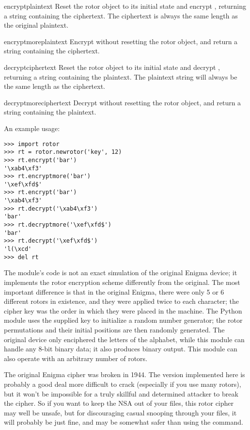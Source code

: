 \begin{methoddesc}[rotor]{encrypt}{plaintext}
Reset the rotor object to its initial state and encrypt ,
returning a string containing the ciphertext.  The ciphertext is always the
same length as the original plaintext.
\end{methoddesc}

\begin{methoddesc}[rotor]{encryptmore}{plaintext}
Encrypt  without resetting the rotor object, and return a
string containing the ciphertext.
\end{methoddesc}

\begin{methoddesc}[rotor]{decrypt}{ciphertext}
Reset the rotor object to its initial state and decrypt ,
returning a string containing the plaintext.  The plaintext string will
always be the same length as the ciphertext.
\end{methoddesc}

\begin{methoddesc}[rotor]{decryptmore}{ciphertext}
Decrypt  without resetting the rotor object, and return a
string containing the plaintext.
\end{methoddesc}

An example usage:
\begin{verbatim}
>>> import rotor
>>> rt = rotor.newrotor('key', 12)
>>> rt.encrypt('bar')
'\xab4\xf3'
>>> rt.encryptmore('bar')
'\xef\xfd$'
>>> rt.encrypt('bar')
'\xab4\xf3'
>>> rt.decrypt('\xab4\xf3')
'bar'
>>> rt.decryptmore('\xef\xfd$')
'bar'
>>> rt.decrypt('\xef\xfd$')
'l(\xcd'
>>> del rt
\end{verbatim}

The module's code is not an exact simulation of the original Enigma
device; it implements the rotor encryption scheme differently from the
original. The most important difference is that in the original
Enigma, there were only 5 or 6 different rotors in existence, and they
were applied twice to each character; the cipher key was the order in
which they were placed in the machine.  The Python 
module uses the supplied key to initialize a random number generator;
the rotor permutations and their initial positions are then randomly
generated.  The original device only enciphered the letters of the
alphabet, while this module can handle any 8-bit binary data; it also
produces binary output.  This module can also operate with an
arbitrary number of rotors.

The original Enigma cipher was broken in 1944. %
The version implemented here is probably a good deal more difficult to crack
(especially if you use many rotors), but it won't be impossible for
a truly skillful and determined attacker to break the cipher.  So if you want
to keep the NSA out of your files, this rotor cipher may well be unsafe, but
for discouraging casual snooping through your files, it will probably be
just fine, and may be somewhat safer than using the \UNIX{} 
command.
